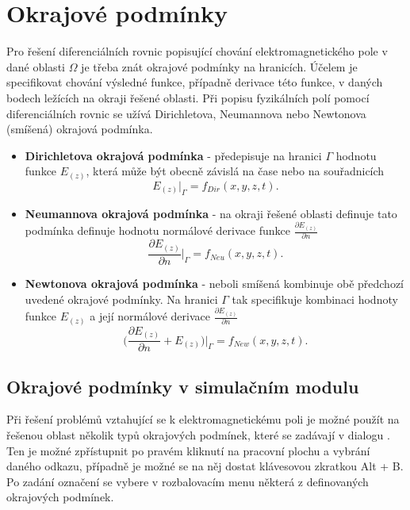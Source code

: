 \section{Okrajové podmínky}
Pro řešení diferenciálních rovnic popisující chování elektromagnetického pole v dané oblasti $\Omega$ je třeba znát okrajové podmínky na hranicích. Účelem je specifikovat chování výsledné funkce, případně derivace této funkce, v daných bodech ležících na okraji řešené oblasti. Při popisu fyzikálních polí pomocí diferenciálních rovnic se užívá Dirichletova, Neumannova nebo Newtonova (smíšená) okrajová podmínka.
\begin{itemize}
\item {\bf Dirichletova okrajová podmínka} - předepisuje na hranici $\Gamma$ hodnotu funkce $E_{(z)}$, která může být obecně závislá na čase nebo na souřadnicích
\begin{displaymath}
	E_{(z)}|_{\Gamma} = f_{Dir}(x,y,z,t). 
\end{displaymath}
\item {\bf Neumannova okrajová podmínka} - na okraji řešené oblasti definuje tato podmínka definuje hodnotu normálové derivace funkce $\frac{\partial E_{(z)}}{\partial n}$
\begin{displaymath}
	\frac{\partial E_{(z)}}{\partial n}|_{\Gamma} = f_{Neu}(x,y,z,t). 
\end{displaymath}
\item {\bf Newtonova okrajová podmínka} - neboli smíšená kombinuje obě předchozí uvedené okrajové podmínky. Na hranici $\Gamma$ tak specifikuje kombinaci hodnoty funkce $E_{(z)}$ a její normálové derivace $\frac{\partial E_{(z)}}{\partial n}$
\begin{displaymath}
	\bigg(\frac{\partial E_{(z)}}{\partial n} + E_{(z)}\bigg)|_{\Gamma} = f_{New}(x,y,z,t). 
\end{displaymath}
\end{itemize}

\subsection{Okrajové podmínky v simulačním modulu}
Při řešení problémů vztahující se k elektromagnetickému poli je možné použít na řešenou oblast několik typů okrajových podmínek, které se zadávají v dialogu . Ten je možné zpřístupnit po pravém kliknutí na pracovní plochu a vybrání daného odkazu, případně je možné se na něj dostat klávesovou zkratkou Alt + B. Po zadání označení se vybere v rozbalovacím menu některá z definovaných okrajových podmínek.


